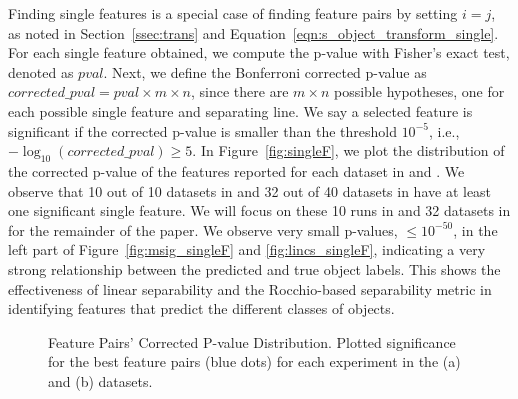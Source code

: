  Finding \topk single features is a special case of finding feature pairs by setting $i=j$, as noted in Section~\ref{ssec:trans} and Equation~\ref{eqn:s_object_transform_single}. For each single feature obtained, we compute the p-value with Fisher's exact test, denoted as $pval$. Next, we define the Bonferroni corrected p-value as $corrected\_pval= pval\times m \times n$, since there are $m \times n$ possible hypotheses, one for each possible single feature and separating line. We say a selected feature is significant if the corrected p-value is smaller than the threshold $10^{-5}$, i.e., $-\log_{10} (corrected\_pval)\geq5$. In Figure~\ref{fig:singleF}, we plot the distribution of the corrected p-value of the \tophundred features reported for each dataset in \msig and \lincs. We observe that 10 out of 10 datasets in \msig and 32 out of 40 datasets in \lincs have at least one significant single feature. We will focus on these 10 runs in \msig and 32 datasets in \lincs for the remainder of the paper. We observe very small p-values, $\leq 10^{-50}$, in the left part of Figure~\ref{fig:msig_singleF} and \ref{fig:lincs_singleF}, indicating a very strong relationship between the predicted and true object labels. This shows the effectiveness of linear separability and the Rocchio-based separability metric in identifying features that predict the different classes of objects.

%

\begin{figure}[h]
\centering %
\vspace{-5mm}
\vspace{-5mm}
\caption{Feature Pairs' Corrected P-value Distribution. Plotted significance for the \tophundred best feature pairs (blue dots) for each experiment in the (a) \msig and (b) \lincs datasets.}
\vspace{-5mm}
\label{fig:FP}
\end{figure}

